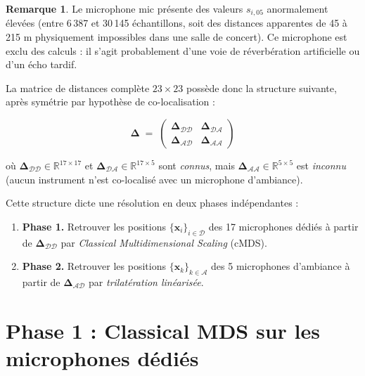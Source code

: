 \documentclass[12pt, a4paper]{article}
\theoremstyle{plain}
\theoremstyle{definition}
\newtheorem{remark}[theorem]{Remarque}
\newcommand{\R}{\mathbb{R}}
\newcommand{\mat}[1]{\mathbf{#1}}
\newcommand{\vect}[1]{\mathbf{#1}}
\begin{document}
\begin{remark}
    Le microphone mic présente des valeurs $s_{i,05}$
    anormalement élevées (entre 6\,387 et 30\,145 échantillons, soit des
    distances apparentes de 45 à 215 m physiquement impossibles dans une salle
    de concert). Ce microphone est exclu des calculs : il s'agit probablement
    d'une voie de réverbération artificielle ou d'un écho tardif.
\end{remark}

La matrice de distances complète $23 \times 23$ possède donc la structure
suivante, après symétrie par hypothèse de co-localisation :

\begin{equation}
    \mat{\Delta} \;=\; \begin{pmatrix}
        \mat{\Delta}_{\mathcal{DD}} & \mat{\Delta}_{\mathcal{DA}} \\[4pt]
        \mat{\Delta}_{\mathcal{AD}} & \mat{\Delta}_{\mathcal{AA}}
    \end{pmatrix}
\end{equation}

où $\mat{\Delta}_{\mathcal{DD}} \in \R^{17\times 17}$ et
$\mat{\Delta}_{\mathcal{DA}} \in \R^{17\times 5}$ sont \emph{connus}, mais
$\mat{\Delta}_{\mathcal{AA}} \in \R^{5\times 5}$ est \emph{inconnu} (aucun
instrument n'est co-localisé avec un microphone d'ambiance).

\medskip
Cette structure dicte une résolution en deux phases indépendantes :

\begin{enumerate}
    \item \textbf{Phase 1.} Retrouver les positions $\{\vect{x}_i\}_{i \in
        \mathcal{D}}$ des 17 microphones dédiés à partir de
        $\mat{\Delta}_{\mathcal{DD}}$ par \emph{Classical Multidimensional
        Scaling} (cMDS).
    \item \textbf{Phase 2.} Retrouver les positions $\{\vect{x}_k\}_{k \in
        \mathcal{A}}$ des 5 microphones d'ambiance à partir de
        $\mat{\Delta}_{\mathcal{AD}}$ par \emph{trilatération linéarisée}.
\end{enumerate}

\section{Phase 1 : Classical MDS sur les microphones dédiés}
\end{document}
